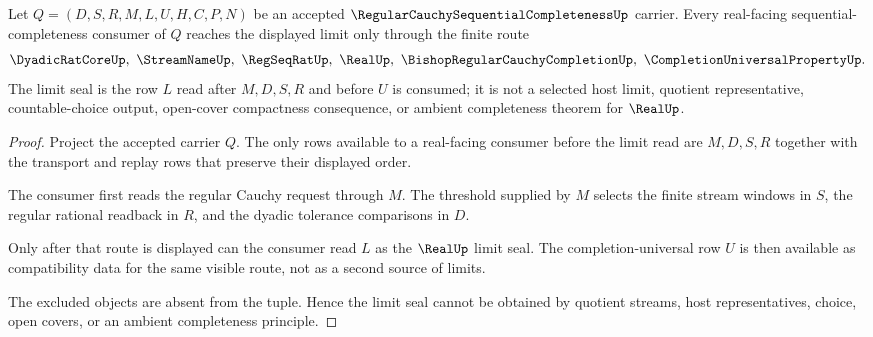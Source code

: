 \begin{theorem}
\label{thm:regular-cauchy-sequential-completeness-limit-seal}
Let $Q=(D,S,R,M,L,U,H,C,P,N)$ be an accepted $\RegularCauchySequentialCompletenessUp$ carrier. Every real-facing sequential-completeness consumer of $Q$ reaches the displayed limit only through the finite route
$$
\DyadicRatCoreUp,\ \StreamNameUp,\ \RegSeqRatUp,\ \RealUp,\ \BishopRegularCauchyCompletionUp,\ \CompletionUniversalPropertyUp .
$$
The limit seal is the row $L$ read after $M,D,S,R$ and before $U$ is consumed; it is not a selected host limit, quotient representative, countable-choice output, open-cover compactness consequence, or ambient completeness theorem for $\RealUp$.
\end{theorem}
\begin{proof}
Project the accepted carrier $Q$. The only rows available to a real-facing consumer before the limit read are $M,D,S,R$ together with the transport and replay rows that preserve their displayed order.

The consumer first reads the regular Cauchy request through $M$. The threshold supplied by $M$ selects the finite stream windows in $S$, the regular rational readback in $R$, and the dyadic tolerance comparisons in $D$.

Only after that route is displayed can the consumer read $L$ as the $\RealUp$ limit seal. The completion-universal row $U$ is then available as compatibility data for the same visible route, not as a second source of limits.

The excluded objects are absent from the tuple. Hence the limit seal cannot be obtained by quotient streams, host representatives, choice, open covers, or an ambient completeness principle.
\end{proof}

